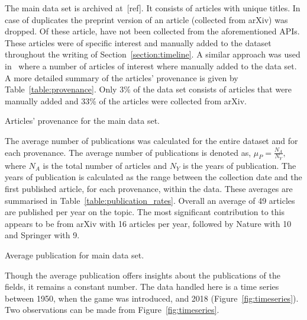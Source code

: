 \documentclass{article}
\theoremstyle{definition}
\newcommand{\totalarticles}{}
\newcommand{\manual}{}
\begin{document}
The main data set is archived at~[ref]. It
consists of \totalarticles articles with unique titles. In case of duplicates
the preprint version of an article (collected from arXiv) was dropped.
Of these \totalarticles article, \manual have not been collected from the
aforementioned APIs. These articles were of specific interest and manually added
to the dataset throughout the writing of Section~\ref{section:timeline}. A
similar approach was used in~\cite{Liu2015} where a number of articles of interest
where manually added to the data set. A more
detailed summary of the articles' provenance is given by Table~\ref{table:provenance}.
Only 3\% of the data set consists of articles that were manually added and 33\% of the
articles were collected from arXiv.

\begin{table}[!hbtp]
    \begin{center}
    
    \end{center}
    \caption{Articles' provenance for the main data set.} %
    \label{table:provenance}
\end{table}

The average number of publications was calculated for the entire dataset and for
each provenance. The average number of publications is denoted as,
\(\mu_P = \frac{N_A}{N_Y},\) where \(N_A\) is the total number of articles and
\(N_Y\) is the years of publication. The years of publication is calculated as
the range between the collection date and the first published article, for each provenance,
within the data.
These averages are summarised in Table~\ref{table:publication_rates}.
Overall an average of 49 articles are published per year on the topic. The most
significant contribution to this appears to be from arXiv with 16 articles per year,
followed by Nature with 10 and Springer with 9.

\begin{table}[!hbtp]
    \begin{center}
    
    \end{center}
    \caption{Average publication for main data set.} %
    \label{table:publication_rates}
\end{table}

Though the average publication offers insights about the publications of the
fields, it remains a constant number. The data handled here is a time
series between 1950, when the game was introduced, and 2018 (Figure~\ref{fig:timeseries}). 
Two observations can be made from Figure~\ref{fig:timeseries}.
\end{document}
